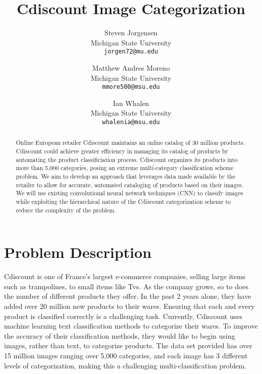 \documentclass[10pt,twocolumn,letterpaper]{article}
\begin{document}
\title{Cdiscount Image Categorization}

\author{Steven Jorgensen\\
Michigan State University \\
{\tt\small jorgen72@mu.edu}
\and
Matthew Andres Moreno\\
Michigan State University\\
{\tt\small mmore500@msu.edu}
\and
Ian Whalen\\
Michigan State University \\
{\tt\small whalenia@msu.edu}
}


\maketitle

\begin{abstract}
Online European retailer Cdiscount maintains an online catalog of 30 million products.
Cdiscount could achieve greater efficiency in managing its catalog of products by automating the product classificiation process. 
Cdiscount organizes its products into more than 5,000 categories, posing an extreme multi-category classification scheme problem.
We aim to develop an approach that leverages data made available by the retailer to allow for accurate, automated cataloging of products based on their images.
We will use existing convolutional neural network techniques (CNN) to classify images while exploiting the hierarchical nature of the Cdiscount categorization scheme to reduce the complexity of the problem.
\end{abstract}

\section{Problem Description}

Cdiscount is one of France's largest e-commerce companies, selling large items such as trampolines, to small items like Tvs.
As the company grows, so to does the number of different products they offer.
In the past 2 years alone, they have added over 20 million new products to their wares.\cite{cDiscountKaggle} 
Ensuring that each and every product is classified correctly is a challenging task.
Currently, Cdiscount uses machine learning text classification methods to categorize their wares.
To improve the accuracy of their classification methods, they would like to begin using images, rather than text, to categorize products.
The data set provided has over 15 million images ranging over 5,000 categories, and each image has 3 different levels of categorization, making this a challenging multi-classification problem.
\end{document}
